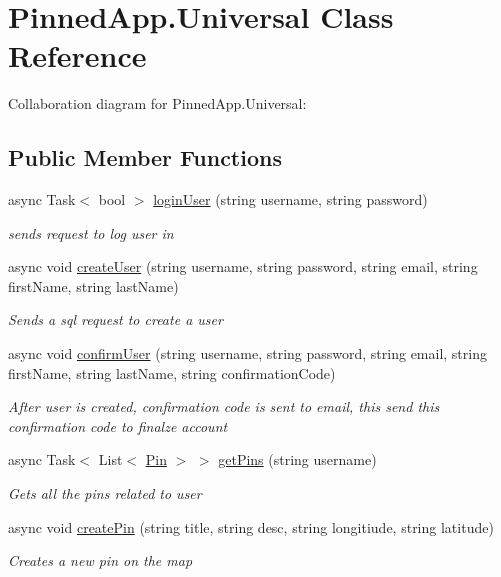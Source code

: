 \hypertarget{class_pinned_app_1_1_universal}{}\section{Pinned\+App.\+Universal Class Reference}
\label{class_pinned_app_1_1_universal}


Collaboration diagram for Pinned\+App.\+Universal\+:
\subsection*{Public Member Functions}
\begin{DoxyCompactItemize}
\item 
async Task$<$ bool $>$ \hyperlink{class_pinned_app_1_1_universal_ae5546bb53491c873008ff91b6071a167}{login\+User} (string username, string password)
\begin{DoxyCompactList}\small\item\em sends request to log user in \end{DoxyCompactList}\item 
async void \hyperlink{class_pinned_app_1_1_universal_a2b5a78038acf379ddeef662b1158fa7c}{create\+User} (string username, string password, string email, string first\+Name, string last\+Name)
\begin{DoxyCompactList}\small\item\em Sends a sql request to create a user \end{DoxyCompactList}\item 
async void \hyperlink{class_pinned_app_1_1_universal_a1140d279509d83107ee64c94c5a4f85c}{confirm\+User} (string username, string password, string email, string first\+Name, string last\+Name, string confirmation\+Code)
\begin{DoxyCompactList}\small\item\em After user is created, confirmation code is sent to email, this send this confirmation code to finalze account \end{DoxyCompactList}\item 
async Task$<$ List$<$ \hyperlink{class_pinned_app_1_1_pin}{Pin} $>$ $>$ \hyperlink{class_pinned_app_1_1_universal_a33520164db0cdcd36aa62f548ac88e39}{get\+Pins} (string username)
\begin{DoxyCompactList}\small\item\em Gets all the pins related to user \end{DoxyCompactList}\item 
async void \hyperlink{class_pinned_app_1_1_universal_a6673d2119bdb0f4e302c98ddd28de646}{create\+Pin} (string title, string desc, string longitiude, string latitude)
\begin{DoxyCompactList}\small\item\em Creates a new pin on the map \end{DoxyCompactList}\end{DoxyCompactItemize}
